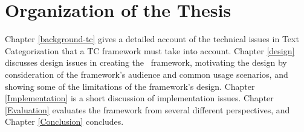 \section{Organization of the Thesis}

Chapter \ref{background-tc} gives a detailed account of the technical
issues in Text Categorization that a TC framework must take into
account.  Chapter \ref{design} discusses design issues in creating the
\aicat\ framework, motivating the design by consideration of the
framework's audience and common usage scenarios, and showing some of
the limitations of the framework's design.  Chapter
\ref{Implementation} is a short discussion of implementation issues.
Chapter \ref{Evaluation} evaluates the framework from several
different perspectives, and Chapter \ref{Conclusion} concludes.
